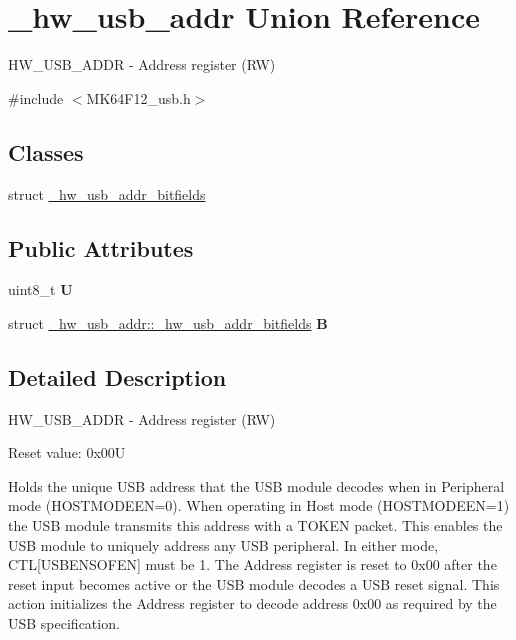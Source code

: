 \hypertarget{union__hw__usb__addr}{}\section{\+\_\+hw\+\_\+usb\+\_\+addr Union Reference}
\label{union__hw__usb__addr}


H\+W\+\_\+\+U\+S\+B\+\_\+\+A\+D\+DR -\/ Address register (RW)  




{\ttfamily \#include $<$M\+K64\+F12\+\_\+usb.\+h$>$}

\subsection*{Classes}
\begin{DoxyCompactItemize}
\item 
struct \hyperlink{struct__hw__usb__addr_1_1__hw__usb__addr__bitfields}{\+\_\+hw\+\_\+usb\+\_\+addr\+\_\+bitfields}
\end{DoxyCompactItemize}
\subsection*{Public Attributes}
\begin{DoxyCompactItemize}
\item 
uint8\+\_\+t {\bfseries U}\hypertarget{union__hw__usb__addr_ac872c6150a98bb7e2f001f5289fd23a8}{}\label{union__hw__usb__addr_ac872c6150a98bb7e2f001f5289fd23a8}

\item 
struct \hyperlink{struct__hw__usb__addr_1_1__hw__usb__addr__bitfields}{\+\_\+hw\+\_\+usb\+\_\+addr\+::\+\_\+hw\+\_\+usb\+\_\+addr\+\_\+bitfields} {\bfseries B}\hypertarget{union__hw__usb__addr_af5bfe729200da5864657f894d45b0bf1}{}\label{union__hw__usb__addr_af5bfe729200da5864657f894d45b0bf1}

\end{DoxyCompactItemize}


\subsection{Detailed Description}
H\+W\+\_\+\+U\+S\+B\+\_\+\+A\+D\+DR -\/ Address register (RW) 

Reset value\+: 0x00U

Holds the unique U\+SB address that the U\+SB module decodes when in Peripheral mode (H\+O\+S\+T\+M\+O\+D\+E\+EN=0). When operating in Host mode (H\+O\+S\+T\+M\+O\+D\+E\+EN=1) the U\+SB module transmits this address with a T\+O\+K\+EN packet. This enables the U\+SB module to uniquely address any U\+SB peripheral. In either mode, C\+TL\mbox{[}U\+S\+B\+E\+N\+S\+O\+F\+EN\mbox{]} must be 1. The Address register is reset to 0x00 after the reset input becomes active or the U\+SB module decodes a U\+SB reset signal. This action initializes the Address register to decode address 0x00 as required by the U\+SB specification. 

